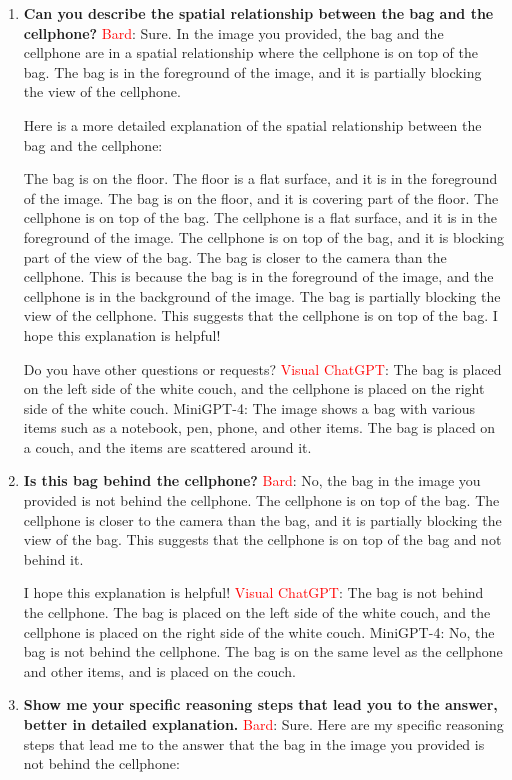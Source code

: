 \begin{enumerate}
    \item \textbf{Can you describe the spatial relationship between the bag and the cellphone?}
    \subitem \textcolor{Red}{Bard}: Sure. In the image you provided, the bag and the cellphone are in a spatial relationship where the cellphone is on top of the bag. The bag is in the foreground of the image, and it is partially blocking the view of the cellphone.

    Here is a more detailed explanation of the spatial relationship between the bag and the cellphone:
    
    The bag is on the floor. The floor is a flat surface, and it is in the foreground of the image. The bag is on the floor, and it is covering part of the floor.
    The cellphone is on top of the bag. The cellphone is a flat surface, and it is in the foreground of the image. The cellphone is on top of the bag, and it is blocking part of the view of the bag.
    The bag is closer to the camera than the cellphone. This is because the bag is in the foreground of the image, and the cellphone is in the background of the image.
    The bag is partially blocking the view of the cellphone. This suggests that the cellphone is on top of the bag.
    I hope this explanation is helpful!
    
    Do you have other questions or requests?
    \subitem \textcolor{red}{Visual ChatGPT}: The bag is placed on the left side of the white couch, and the cellphone is placed on the right side of the white couch.
    \subitem MiniGPT-4: The image shows a bag with various items such as a notebook, pen, phone, and other items. The bag is placed on a couch, and the items are scattered around it.
    \item \textbf{Is this bag behind the cellphone?}
    \subitem \textcolor{Red}{Bard}: No, the bag in the image you provided is not behind the cellphone. The cellphone is on top of the bag. The cellphone is closer to the camera than the bag, and it is partially blocking the view of the bag. This suggests that the cellphone is on top of the bag and not behind it.

    I hope this explanation is helpful!
    \subitem \textcolor{red}{Visual ChatGPT}: The bag is not behind the cellphone. The bag is placed on the left side of the white couch, and the cellphone is placed on the right side of the white couch.
    \subitem MiniGPT-4: No, the bag is not behind the cellphone. The bag is on the same level as the cellphone and other items, and is placed on the couch.
    \item \textbf{Show me your specific reasoning steps that lead you to the answer, better in detailed explanation.}
    \subitem \textcolor{Red}{Bard}: 
    Sure. Here are my specific reasoning steps that lead me to the answer that the bag in the image you provided is not behind the cellphone:
    

\end{enumerate}
